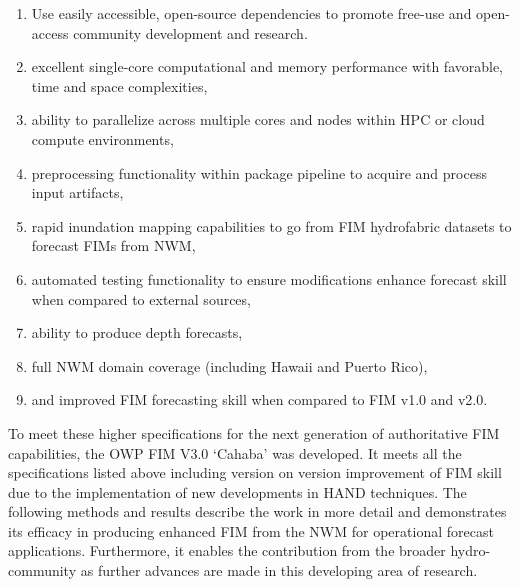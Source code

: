 \begin{enumerate}
\item Use easily accessible, open-source dependencies to promote free-use and open-access community development and research.
\item excellent single-core computational and memory performance with favorable, time and space complexities,
\item ability to parallelize across multiple cores and nodes within HPC or cloud compute environments,
\item preprocessing functionality within package pipeline to acquire and process input artifacts,
\item rapid inundation mapping capabilities to go from FIM hydrofabric datasets to forecast FIMs from NWM,
\item automated testing functionality to ensure modifications enhance forecast skill when compared to external sources,
\item ability to produce depth forecasts,
\item full NWM domain coverage (including Hawaii and Puerto Rico),
\item and improved FIM forecasting skill when compared to FIM v1.0 and v2.0.
\end{enumerate} 

To meet these higher specifications for the next generation of authoritative FIM capabilities, the OWP FIM V3.0 `Cahaba' was developed. It meets all the specifications listed above including version on version improvement of FIM skill due to the implementation of new developments in HAND techniques. The following methods and results describe the work in more detail and demonstrates its efficacy in producing enhanced FIM from the NWM for operational forecast applications. Furthermore, it enables the contribution from the broader hydro-community as further advances are made in this developing area of research.

  
